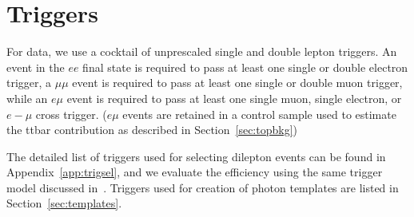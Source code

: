 
\section{Triggers}
\label{sec:trigSel}

For data, we use a cocktail of unprescaled single 
and double lepton triggers. An event
in the $ee$ final state is required to pass at least one
single or double electron trigger, a
$\mu\mu$ event is required to pass at least one single 
or double muon trigger, while an $e\mu$ event
is required to pass at least one single muon, single electron, 
or $e-\mu$ cross trigger. ($e\mu$ events are retained in a control sample used to estimate the ttbar contribution as described in Section~\ref{sec:topbkg})

The detailed list of triggers used for selecting dilepton events can be found in Appendix~\ref{app:trigsel},
and we evaluate the efficiency using the same trigger model discussed in~\cite{ref:GenericOS}.
Triggers used for creation of photon templates are listed in Section~\ref{sec:templates}.
